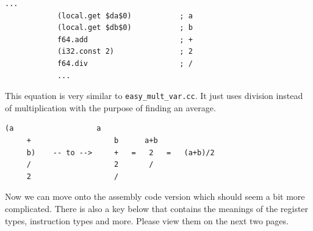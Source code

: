 \documentclass{article}
\theoremstyle{theorem}
\theoremstyle{definition}
\theoremstyle{remark}
\begin{document}
\medskip\noindent
\begin{lstlisting}[style=WasmStyle]
            ...
            (local.get $da$0)           ; a
            (local.get $db$0)           ; b
            f64.add                     ; +
            (i32.const 2)               ; 2
            f64.div                     ; /
            ...
\end{lstlisting}

\medskip\noindent
This equation is very similar to \verb|easy_mult_var.cc|. It just uses division instead of multiplication with the purpose of finding an average.

\medskip\noindent
\begin{lstlisting}[style=CStyle]
    (a                   a
     +                   b      a+b
     b)    -- to -->     +   =   2   =   (a+b)/2
     /                   2       /
     2                   /
\end{lstlisting}

\medskip\noindent
Now we can move onto the assembly code version which should seem a bit more complicated. There is also a key below that contains the meanings of the register types, instruction types and more. Please view them on the next two pages.

\bigskip
\bigskip
\bigskip
\bigskip
\bigskip
\bigskip
\bigskip
\end{document}
